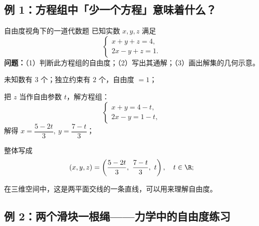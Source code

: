 \documentclass[a4paper,11pt]{ctexart}
\begin{document}
\subsection{例 1：方程组中「少一个方程」意味着什么？}

\begin{examplebox}{自由度视角下的一道代数题}
  已知实数 $x,y,z$ 满足
  \[
    \begin{cases}
      x + y + z = 4,\\[0.3em]
      2x - y + z = 1.
    \end{cases}
  \]
  \textbf{问题：}（1）判断此方程组的自由度；（2）写出其通解；（3）画出解集的几何示意。

  \begin{focuspoints}
    \item 未知数有 $3$ 个；独立约束有 $2$ 个，自由度 $=1$；
    \item 把 $z$ 当作自由参数 $t$，解方程组：
          \[
            \begin{cases}
              x + y = 4 - t,\\
              2x - y = 1 - t,
            \end{cases}
          \]
          解得 $x = \dfrac{5-2t}{3},\ y = \dfrac{7-t}{3}$；
    \item 整体写成
          \[
            (x,y,z) = \left(\frac{5-2t}{3},\ \frac{7-t}{3},\ t\right),\quad t\in\R;
          \]
    \item 在三维空间中，这是两平面交线的一条直线，可以用来理解自由度。
  \end{focuspoints}
\end{examplebox}

\subsection{例 2：两个滑块一根绳——力学中的自由度练习}
\end{document}
